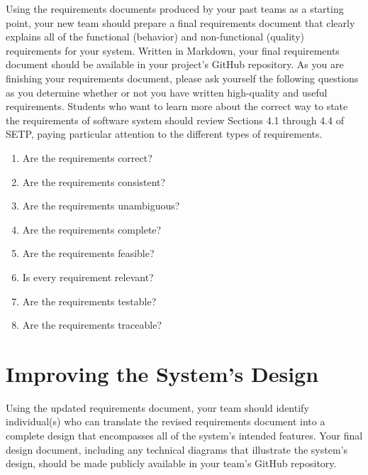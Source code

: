 Using the requirements documents produced by your past teams as a starting point, your new team should prepare a final
requirements document that clearly explains all of the functional (behavior) and non-functional (quality) requirements
for your system. Written in Markdown, your final requirements document should be available in your project's GitHub
repository. As you are finishing your requirements document, please ask yourself the following questions as you
determine whether or not you have written high-quality and useful requirements. Students who want to learn more about
the correct way to state the requirements of software system should review Sections 4.1 through 4.4 of SETP, paying
particular attention to the different types of requirements.

\vspace*{-.1in}
\begin{enumerate}

  \itemsep 0in

  \item Are the requirements correct?
  \item Are the requirements consistent?
  \item Are the requirements unambiguous?
  \item Are the requirements complete?
  \item Are the requirements feasible?
  \item Is every requirement relevant?
  \item Are the requirements testable?
  \item Are the requirements traceable?

\end{enumerate}
\vspace*{-.15in}

\section*{Improving the System's Design}

Using the updated requirements document, your team should identify individual(s) who can translate the revised
requirements document into a complete design that encompasses all of the system's intended features. Your final design
document, including any technical diagrams that illustrate the system's design, should be made publicly available in
your team's GitHub repository.

